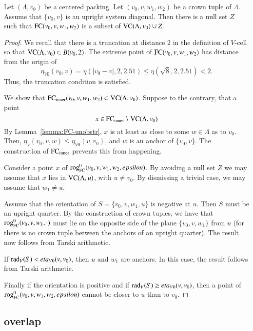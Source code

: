 \begin{lemma}  
Let $(\Lambda,v_0)$ be a centered packing.
Let $(v_0,v,w_1,w_2)$ be a crown tuple of $\Lambda$. Assume that
 $\{v_0,v\}$ is an upright system diagonal.  Then there is a null set $Z$ such
that ${\operatorname{FC}}(v_0,v,w_1,w_2)$ is
a subset of ${\operatorname{VC}}(\Lambda,v_0)\cup Z$.
\end{lemma}

\begin{proof}
We recall that there is a truncation at distance $2$ in the definition
of $V$-cell so that ${\operatorname{VC}}(\Lambda,v_0)\subset B(v_0,2)$.
The extreme point of ${\operatorname{FC}}(v_0,v,w_1,w_2)$ has distance from the origin of
 $$\eta_{V0}(v_0,v) = \eta(|v_0-v|,2,2.51)\le \eta(\sqrt8,2,2.51) < 2.$$
Thus, the truncation condition is satisfied.

We show that ${\operatorname{FC}}_{\text{inner}}(v_0,v,w_1,w_2)\subset{\operatorname{VC}}(\Lambda,v_0)$.
Suppose to the contrary, that a point 
  $$x\in {\operatorname{FC}}_{\text{inner}}\setminus {\operatorname{VC}}(\Lambda,v_0)$$
By Lemma~\ref{lemma:FC-unobstr},  $x$ is at least as close
to some $w\in\Lambda$ as to  $v_0$.  
Then, $\eta_V(v_0,v,w)\le\eta_{V0}(v,v_0)$, and $w$
is an anchor of $\{v_0,v\}$.  The construction of
${\operatorname{FC}}_{\text{inner}}$ prevents this from happening.

Consider a point $x$ of ${\operatorname{rog}}^0_{\text{FC}}(v_0,v,w_1,w_2,epsilon)$.
By avoiding a null set $Z$ we may assume that $x$ lies in
${\operatorname{VC}}(\Lambda,u)$, with $u\ne v_0$.  
By dismissing a trivial case, we may
assume that $w_1\ne u$.

Assume that the orientation of $S=\{v_0,v,w_1,u\}$ is negative at $u$.  
Then $S$ must be an upright quarter.  By
the construction of crown tuples, we have that ${\operatorname{rog}}^0_{\text{FC}}(v_0,v,w_1,\cdot)$ must
lie on the opposite side of the plane $\{v_0,v,w_1\}$ from $u$ (for
there is no crown tuple between the anchors of an upright quarter).  The
result now follows from Tarski arithmetic.

If $\operatorname{rad}_V(S) <eta_{V0}(v,v_0)$, then $u$ and $w_1$ are anchors.  In
this case, the result follows from Tarski arithmetic.

Finally if the orientation is positive and if $\operatorname{rad}_V(S)\ge
eta_{V0}(v,v_0)$, then a point of ${\operatorname{rog}}^0_{\text{FC}}(v_0,v,w_1,w_2,epsilon)$ cannot be closer to $u$ than
to $v_0$.
\end{proof}


\subsection{overlap}%
    \label{sec:overlap}



